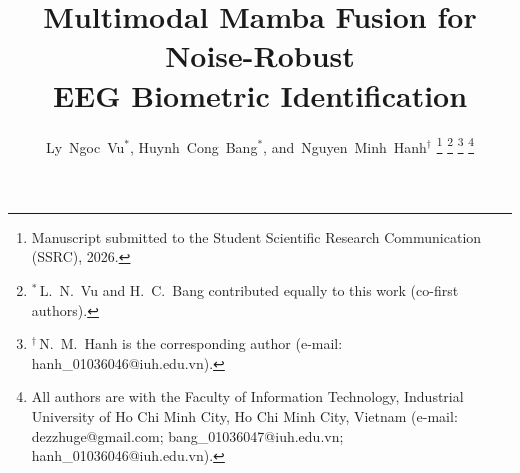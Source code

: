 \documentclass{IEEEtran}
\begin{document}
\title{Multimodal Mamba Fusion for Noise-Robust\\
EEG Biometric Identification}

\author{Ly~Ngoc~Vu$^{*}$, Huynh~Cong~Bang$^{*}$,
        and~Nguyen~Minh~Hanh$^{\dagger}$
\thanks{Manuscript submitted to the Student Scientific Research
Communication (SSRC), 2026.}
\thanks{$^{*}$\,L.~N.~Vu and H.~C.~Bang contributed equally to this work
(co-first authors).}
\thanks{$^{\dagger}$\,N.~M.~Hanh is the corresponding author
(e-mail: hanh\_01036046@iuh.edu.vn).}
\thanks{All authors are with the Faculty of Information Technology,
Industrial University of Ho Chi Minh City, Ho Chi Minh City, Vietnam
(e-mail: dezzhuge@gmail.com; bang\_01036047@iuh.edu.vn;
hanh\_01036046@iuh.edu.vn).}}

\maketitle
\end{document}
